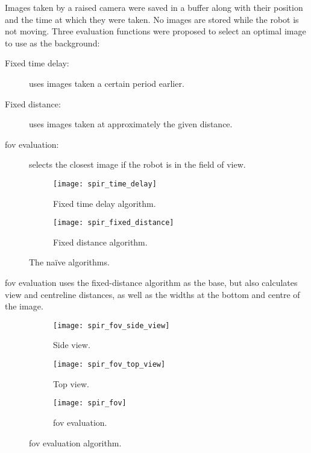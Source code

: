   Images taken by a raised camera were saved in a buffer along with their position and the time at which they were taken.
  No images are stored while the robot is not moving.
  Three evaluation functions were proposed to select an optimal image to use as the background:

  \begin{description}
    \item [Fixed time delay:] uses images taken a certain period earlier.
    \item [Fixed distance:] uses images taken at approximately the given distance.
    \item [\Gls{fov} evaluation:] selects the closest image if the robot is in the field of view.
  \end{description}

  \begin{figure}[h]
    \centering
    \begin{subfigure}[b]{0.45\textwidth}
      \texttt{[image: spir\_time\_delay]}
      \caption{Fixed time delay algorithm.}
      \label{fig:spir_time_delay}
    \end{subfigure}
    \hfill
    \begin{subfigure}[b]{0.45\textwidth}
      \texttt{[image: spir\_fixed\_distance]}
      \caption{Fixed distance algorithm.}
      \label{fig:spir_fixed_distance}
    \end{subfigure}
    \caption[\acrshort{spir} naïve algorithms]{The naïve algorithms.\cite{shiroma2004}}
    \label{fig:spir_naive_algorithms}
  \end{figure}

  \Gls{fov} evaluation uses the fixed-distance algorithm as the base, but also calculates view and centreline distances, as well as the widths at the bottom and centre of the image.

  \begin{figure}[h]
    \centering
    \begin{subfigure}[b]{0.3\textwidth}
      \texttt{[image: spir\_fov\_side\_view]}
      \caption{Side view.}
      \label{fig:spir_fov_side_view}
    \end{subfigure}
    \hfill
    \begin{subfigure}[b]{0.3\textwidth}
      \texttt{[image: spir\_fov\_top\_view]}
      \caption{Top view.}
      \label{fig:spir_fov_top_view}
    \end{subfigure}
    \hfill
    \begin{subfigure}[b]{0.3\textwidth}
      \texttt{[image: spir\_fov]}
      \caption{\Gls{fov} evaluation.}
      \label{fig:spir_fov_flowchart}
    \end{subfigure}
    \caption[\acrshort{spir} \gls{fov} evaluation algorithm]{\Gls{fov} evaluation algorithm.\cite{shiroma2004}}
    \label{fig:spir_fov}
  \end{figure}

